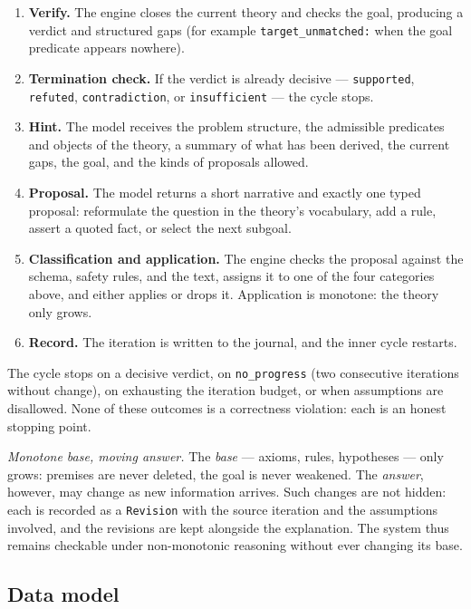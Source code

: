 \documentclass[11pt,a4paper]{article}
\begin{document}
\begin{enumerate}
\item \textbf{Verify.} The engine closes the current theory and checks the goal, producing a
verdict and structured gaps (for example \texttt{target\_unmatched:} when the goal predicate
appears nowhere).
\item \textbf{Termination check.} If the verdict is already decisive --- \texttt{supported},
\texttt{refuted}, \texttt{contradiction}, or \texttt{insufficient} --- the cycle stops.
\item \textbf{Hint.} The model receives the problem structure, the admissible predicates and
objects of the theory, a summary of what has been derived, the current gaps, the goal, and
the kinds of proposals allowed.
\item \textbf{Proposal.} The model returns a short narrative and exactly one typed proposal:
reformulate the question in the theory's vocabulary, add a rule, assert a quoted fact, or
select the next subgoal.
\item \textbf{Classification and application.} The engine checks the proposal against the
schema, safety rules, and the text, assigns it to one of the four categories above, and
either applies or drops it. Application is monotone: the theory only grows.
\item \textbf{Record.} The iteration is written to the journal, and the inner cycle
restarts.
\end{enumerate}

The cycle stops on a decisive verdict, on \texttt{no\_progress} (two consecutive iterations
without change), on exhausting the iteration budget, or when assumptions are disallowed.
None of these outcomes is a correctness violation: each is an honest stopping point.

\emph{Monotone base, moving answer.} The \emph{base} --- axioms, rules, hypotheses --- only
grows: premises are never deleted, the goal is never weakened. The \emph{answer}, however,
may change as new information arrives. Such changes are not hidden: each is recorded as a
\texttt{Revision} with the source iteration and the assumptions involved, and the revisions
are kept alongside the explanation. The system thus remains checkable under non-monotonic
reasoning without ever changing its base.

\subsection{Data model}
\end{document}

